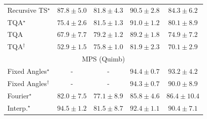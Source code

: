 \begin{tabular}{l|cccc|}
Recursive TS$^\star$ & {\cellcolor[HTML]{84248A}} \color[HTML]{F1F1F1} $87.8\pm 5.0$ & {\cellcolor[HTML]{8A58A8}} \color[HTML]{F1F1F1} $81.8\pm 4.3$ & {\cellcolor[HTML]{7B0D76}} \color[HTML]{F1F1F1} $90.5\pm 2.8$ & {\cellcolor[HTML]{88449E}} \color[HTML]{F1F1F1} $84.3\pm 6.2$ \\
TQA$^\star$ & {\cellcolor[HTML]{8C8BC0}} \color[HTML]{F1F1F1} $75.4\pm 2.6$ & {\cellcolor[HTML]{8A59A8}} \color[HTML]{F1F1F1} $81.5\pm 1.3$ & {\cellcolor[HTML]{760C71}} \color[HTML]{F1F1F1} $91.0\pm 1.2$ & {\cellcolor[HTML]{8B65AE}} \color[HTML]{F1F1F1} $80.1\pm 8.9$ \\
TQA & {\cellcolor[HTML]{A3BFDC}} \color[HTML]{000000} $67.9\pm 7.7$ & {\cellcolor[HTML]{8C6CB1}} \color[HTML]{F1F1F1} $79.2\pm 1.2$ & {\cellcolor[HTML]{821580}} \color[HTML]{F1F1F1} $89.2\pm 1.8$ & {\cellcolor[HTML]{8C8FC2}} \color[HTML]{F1F1F1} $74.9\pm 7.2$ \\
TQA$^\dagger$ & {\cellcolor[HTML]{F6FBFD}} \color[HTML]{000000} $52.9\pm 1.5$ & {\cellcolor[HTML]{8C88BF}} \color[HTML]{F1F1F1} $75.8\pm 1.0$ & {\cellcolor[HTML]{8A56A7}} \color[HTML]{F1F1F1} $81.9\pm 2.3$ & {\cellcolor[HTML]{99B2D5}} \color[HTML]{000000} $70.1\pm 2.9$ \\
\cline{1-5}
\multicolumn{5}{c}{\rule{0pt}{8pt}MPS (Quimb)} \\
\midrule
Fixed Angles$^\star$ & {\cellcolor[HTML]{000000}} \color[HTML]{F1F1F1} {\cellcolor{white}} \color{black} - & {\cellcolor[HTML]{000000}} \color[HTML]{F1F1F1} {\cellcolor{white}} \color{black} - & {\cellcolor[HTML]{6E2706}} \color[HTML]{F1F1F1} $94.4\pm 0.7$ & {\cellcolor[HTML]{792B05}} \color[HTML]{F1F1F1} $93.2\pm 4.2$ \\
Fixed Angles$^\dagger$ & {\cellcolor[HTML]{000000}} \color[HTML]{F1F1F1} {\cellcolor{white}} \color{black} - & {\cellcolor[HTML]{000000}} \color[HTML]{F1F1F1} {\cellcolor{white}} \color{black} - & {\cellcolor[HTML]{702806}} \color[HTML]{F1F1F1} $94.3\pm 0.7$ & {\cellcolor[HTML]{983404}} \color[HTML]{F1F1F1} $90.0\pm 8.9$ \\
Fourier$^\star$ & {\cellcolor[HTML]{DB5D0B}} \color[HTML]{F1F1F1} $82.0\pm 7.5$ & {\cellcolor[HTML]{F4811D}} \color[HTML]{F1F1F1} $77.1\pm 8.9$ & {\cellcolor[HTML]{C14702}} \color[HTML]{F1F1F1} $85.8\pm 4.6$ & {\cellcolor[HTML]{BB4403}} \color[HTML]{F1F1F1} $86.4\pm 10.4$ \\
Interp.$^\star$ & {\cellcolor[HTML]{6C2706}} \color[HTML]{F1F1F1} $94.5\pm 1.2$ & {\cellcolor[HTML]{DE610C}} \color[HTML]{F1F1F1} $81.5\pm 8.7$ & {\cellcolor[HTML]{812D05}} \color[HTML]{F1F1F1} $92.4\pm 1.1$ & {\cellcolor[HTML]{943304}} \color[HTML]{F1F1F1} $90.4\pm 7.1$ \\

\end{tabular}
